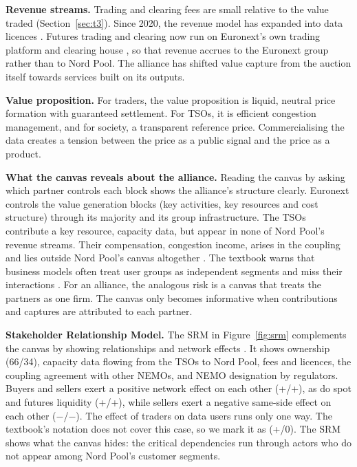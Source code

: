 \textbf{Revenue streams.} Trading and clearing fees are small relative to the value traded (Section~\ref{sec:t3}). Since 2020, the revenue model has expanded into data licences \citep{ERR2022,NPData}. Futures trading and clearing now run on Euronext's own trading platform and clearing house \citep{Euronext2026}, so that revenue accrues to the Euronext group rather than to Nord Pool. The alliance has shifted value capture from the auction itself towards services built on its outputs.

\textbf{Value proposition.} For traders, the value proposition is liquid, neutral price formation with guaranteed settlement. For TSOs, it is efficient congestion management, and for society, a transparent reference price. Commercialising the data creates a tension between the price as a public signal and the price as a product.

\textbf{What the canvas reveals about the alliance.} Reading the canvas by asking which partner controls each block shows the alliance's structure clearly. Euronext controls the value generation blocks (key activities, key resources and cost structure) through its majority and its group infrastructure. The TSOs contribute a key resource, capacity data, but appear in none of Nord Pool's revenue streams. Their compensation, congestion income, arises in the coupling and lies outside Nord Pool's canvas altogether \citep{EU2019943}. The textbook warns that business models often treat user groups as independent segments and miss their interactions \citep[Sect.~10.2.4]{OverbyAudestad2021}. For an alliance, the analogous risk is a canvas that treats the partners as one firm. The canvas only becomes informative when contributions and captures are attributed to each partner.



\textbf{Stakeholder Relationship Model.} The SRM in Figure~\ref{fig:srm} complements the canvas by showing relationships and network effects \citep[Sect.~19.3]{OverbyAudestad2021}. It shows ownership (66/34), capacity data flowing from the TSOs to Nord Pool, fees and licences, the coupling agreement with other NEMOs, and NEMO designation by regulators. Buyers and sellers exert a positive network effect on each other (+/+), as do spot and futures liquidity (+/+), while sellers exert a negative same-side effect on each other ($-$/$-$). The effect of traders on data users runs only one way. The textbook's notation does not cover this case, so we mark it as (+/0). The SRM shows what the canvas hides: the critical dependencies run through actors who do not appear among Nord Pool's customer segments.


